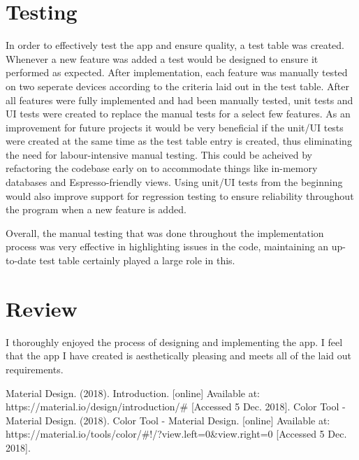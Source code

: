 \documentclass[runningheads]{llncs}
\begin{document}
	\section{Testing}
	In order to effectively test the app and ensure quality, a test table was created. Whenever a new feature was added a test would be designed to ensure it performed as expected. After implementation, each feature was manually tested on two seperate devices according to the criteria laid out in the test table. After all features were fully implemented and had been manually tested, unit tests and UI tests were created to replace the manual tests for a select few features. As an improvement for future projects it would be very beneficial if the unit/UI tests were created at the same time as the test table entry is created, thus eliminating the need for labour-intensive manual testing. This could be acheived by refactoring the codebase early on to accommodate things like in-memory databases and Espresso-friendly views. Using unit/UI tests from the beginning would also improve support for regression testing to ensure reliability throughout the program when a new feature is added.
	
	Overall, the manual testing that was done throughout the implementation process was very effective in highlighting issues in the code, maintaining an up-to-date test table certainly played a large role in this. 
	
	\section{Review}
	I thoroughly enjoyed the process of designing and implementing the app. I feel that the app I have created is aesthetically pleasing and meets all of the laid out requirements. 
	
	\begin{thebibliography}{10}
		Material Design. (2018). Introduction. [online] Available at: https://material.io/design/introduction/\# [Accessed 5 Dec. 2018].
		Color Tool - Material Design. (2018). Color Tool - Material Design. [online] Available at: https://material.io/tools/color/\#!/?view.left=0\&view.right=0 [Accessed 5 Dec. 2018].
		
	\end{thebibliography}
\end{document}
